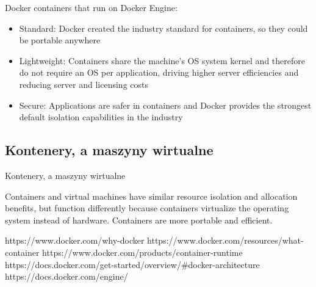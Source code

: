 \documentclass[aspectratio=169]{beamer}
\begin{document}
\begin{frame}
    \begin{card}
        Docker containers that run on Docker Engine:
        \begin{itemize}
            \item Standard: Docker created the industry standard for containers, so they could be portable anywhere
            \item Lightweight: Containers share the machine’s OS system kernel and therefore do not require an OS per application, driving higher server efficiencies and reducing server and licensing costs
            \item Secure: Applications are safer in containers and Docker provides the strongest default isolation capabilities in the industry
        \end{itemize}
    \end{card}
\end{frame}

\subsection{Kontenery, a maszyny wirtualne}
\begin{frame}{Kontenery, a maszyny wirtualne}
    \begin{card}
        Containers and virtual machines have similar resource isolation and allocation benefits,
        but function differently because containers virtualize the operating system instead of hardware.
        Containers are more portable and efficient.
    \end{card}
\end{frame}

https://www.docker.com/why-docker
https://www.docker.com/resources/what-container
https://www.docker.com/products/container-runtime
https://docs.docker.com/get-started/overview/#docker-architecture
https://docs.docker.com/engine/
\end{document}

